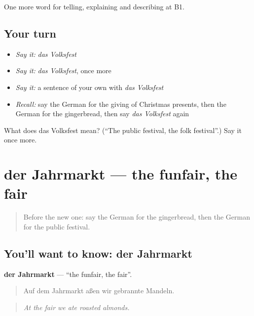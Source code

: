 \begin{grammarlens}[title={What you've built}]
One more word for telling, explaining and describing at B1.
\end{grammarlens}

\subsection*{Your turn}
\begin{itemize}
\raggedright
  \item \emph{Say it:} \emph{das Volksfest}
  \item \emph{Say it:} \emph{das Volksfest}, once more
  \item \emph{Say it:} a sentence of your own with \emph{das Volksfest}
  \item \emph{Recall:} say the German for the giving of Christmas presents, then the German for the gingerbread, then say \emph{das Volksfest} again
\end{itemize}

\begin{tcolorbox}[breakable,colback=teal!4,colframe=teal!35!black,title={Before you move on}]
What does das Volksfest mean? (\textquotedblleft{}The public festival, the folk festival\textquotedblright{}.) Say it once more.
\end{tcolorbox}
\section[der Jahrmarkt]{der Jahrmarkt — the funfair, the fair}

\label{lesson:GE-C312-jahrmarkt}



\begin{quote}
Before the new one: say the German for the gingerbread, then the German for the public festival.
\end{quote}

\subsection*{You'll want to know: der Jahrmarkt}
\textbf{der Jahrmarkt} — \textquotedblleft{}the funfair, the fair\textquotedblright{}.

\begin{quote}
Auf dem Jahrmarkt aßen wir gebrannte Mandeln.
\end{quote}

\begin{quote}
\emph{At the fair we ate roasted almonds.}
\end{quote}

